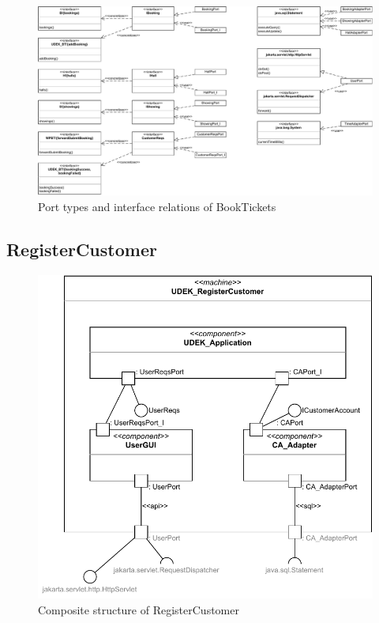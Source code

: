 \documentclass[a4paper,10pt,titlepage,bibtotoc,bibtotocnumbered]{scrreprt}
\begin{document}
\begin{figure}[H]
\centering
\includegraphics[width = \textwidth]{figures/08/A08_BookTickets-Port Types.drawio.pdf}
\caption{Port types and interface relations of BookTickets}
\label{figure:BookTickets_port_types}
\end{figure}

\subsection{RegisterCustomer}

\begin{figure}[H]
\centering
\includegraphics[width = \textwidth]{figures/08/A08_RegisterCustomer-Composite Structure.drawio.pdf}
\caption{Composite structure of RegisterCustomer}
\label{figure:RegisterCustomer_composite_structure}
\end{figure}
\end{document}
